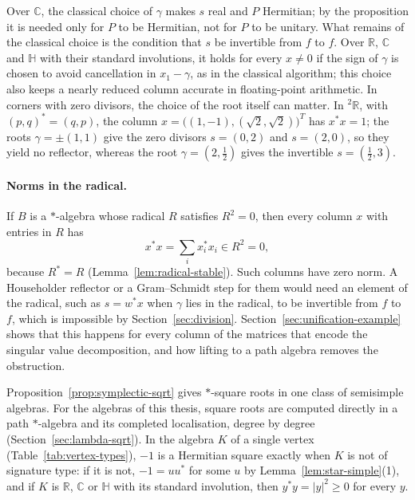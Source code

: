 \documentclass[12pt, a4paper]{report}
\theoremstyle{plain}
\theoremstyle{definition}
\theoremstyle{remark}
\theoremstyle{plain}
\newcommand{\RR}{\mathbb{R}}
\newcommand{\CC}{\mathbb{C}}
\newcommand{\HH}{\mathbb{H}}
\newcommand{\twoR}{{}^{2}\mathbb{R}}
\begin{document}
Over $\CC$, the classical choice of $\gamma$ makes $s$ real and $P$ Hermitian; by the proposition it is needed only for $P$ to be Hermitian, not for $P$ to be unitary. What remains of the classical choice is the condition that $s$ be invertible from $f$ to $f$. Over $\RR$, $\CC$ and $\HH$ with their standard involutions, it holds for every $x\neq0$ if the sign of $\gamma$ is chosen to avoid cancellation in $x_1-\gamma$, as in the classical algorithm; this choice also keeps a nearly reduced column accurate in floating-point arithmetic. In corners with zero divisors, the choice of the root itself can matter. In $\twoR$, with $(p,q)^*=(q,p)$, the column $x=\bigl((1,-1),(\sqrt2,\sqrt2)\bigr)^T$ has $x^*x=1$; the roots $\gamma=\pm(1,1)$ give the zero divisors $s=(0,2)$ and $s=(2,0)$, so they yield no reflector, whereas the root $\gamma=(2,\tfrac12)$ gives the invertible $s=(\tfrac12,3)$.

\paragraph{Norms in the radical.} If $B$ is a $*$-algebra whose radical $R$ satisfies $R^2=0$, then every column $x$ with entries in $R$ has
\[ x^*x=\sum_ix_i^*x_i\in R^2=0, \]
because $R^*=R$ (Lemma~\ref{lem:radical-stable}). Such columns have zero norm. A Householder reflector or a Gram--Schmidt step for them would need an element of the radical, such as $s=w^*x$ when $\gamma$ lies in the radical, to be invertible from $f$ to $f$, which is impossible by Section~\ref{sec:division}. Section~\ref{sec:unification-example} shows that this happens for every column of the matrices that encode the singular value decomposition, and how lifting to a path algebra removes the obstruction.

Proposition~\ref{prop:symplectic-sqrt} gives $*$-square roots in one class of semisimple algebras. For the algebras of this thesis, square roots are computed directly in a path $*$-algebra and its completed localisation, degree by degree (Section~\ref{sec:lambda-sqrt}). In the algebra $K$ of a single vertex (Table~\ref{tab:vertex-types}), $-1$ is a Hermitian square exactly when $K$ is not of signature type: if it is not, $-1=uu^*$ for some $u$ by Lemma~\ref{lem:star-simple}(1), and if $K$ is $\RR$, $\CC$ or $\HH$ with its standard involution, then $y^*y=|y|^2\geq0$ for every $y$.
\end{document}
